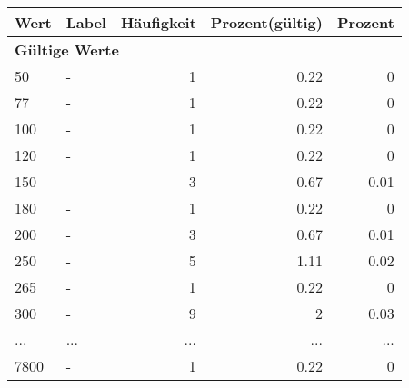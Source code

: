      \begin{longtable}{lXrrr}
     \toprule
     \textbf{Wert} & \textbf{Label} & \textbf{Häufigkeit} & \textbf{Prozent(gültig)} & \textbf{Prozent} \\
     \endhead
     \midrule
     \multicolumn{5}{l}{\textbf{Gültige Werte}}\\
        50 & \multicolumn{1}{X}{-} & %
          \num{1} &
          \num[round-mode=places,round-precision=2]{0,22} &
          \num[round-mode=places,round-precision=2]{0} \\
        77 & \multicolumn{1}{X}{-} & %
          \num{1} &
          \num[round-mode=places,round-precision=2]{0,22} &
          \num[round-mode=places,round-precision=2]{0} \\
        100 & \multicolumn{1}{X}{-} & %
          \num{1} &
          \num[round-mode=places,round-precision=2]{0,22} &
          \num[round-mode=places,round-precision=2]{0} \\
        120 & \multicolumn{1}{X}{-} & %
          \num{1} &
          \num[round-mode=places,round-precision=2]{0,22} &
          \num[round-mode=places,round-precision=2]{0} \\
        150 & \multicolumn{1}{X}{-} & %
          \num{3} &
          \num[round-mode=places,round-precision=2]{0,67} &
          \num[round-mode=places,round-precision=2]{0,01} \\
        180 & \multicolumn{1}{X}{-} & %
          \num{1} &
          \num[round-mode=places,round-precision=2]{0,22} &
          \num[round-mode=places,round-precision=2]{0} \\
        200 & \multicolumn{1}{X}{-} & %
          \num{3} &
          \num[round-mode=places,round-precision=2]{0,67} &
          \num[round-mode=places,round-precision=2]{0,01} \\
        250 & \multicolumn{1}{X}{-} & %
          \num{5} &
          \num[round-mode=places,round-precision=2]{1,11} &
          \num[round-mode=places,round-precision=2]{0,02} \\
        265 & \multicolumn{1}{X}{-} & %
          \num{1} &
          \num[round-mode=places,round-precision=2]{0,22} &
          \num[round-mode=places,round-precision=2]{0} \\
        300 & \multicolumn{1}{X}{-} & %
          \num{9} &
          \num[round-mode=places,round-precision=2]{2} &
          \num[round-mode=places,round-precision=2]{0,03} \\
       ... & ... & ... & ... & ... \\
        7800 & \multicolumn{1}{X}{-} & %
          \num{1} &
          \num[round-mode=places,round-precision=2]{0,22} &
          \num[round-mode=places,round-precision=2]{0} \\


\end{longtable}
